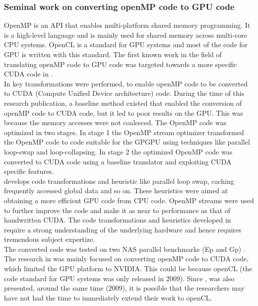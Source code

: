 \documentclass[a4paper,11pt]{article}
\begin{document}
\subsubsection{Seminal work on converting openMP code to GPU code}
\indent\indent OpenMP is an API that enables multi-platform shared memory programming. It is a high-level language and is mainly used for shared memory across multi-core CPU systems. OpenCL is a standard for GPU systems and most of the code for GPU is written with this standard. The first known work in the field of translating openMP code to GPU code was targeted towards a more specific CUDA code in \cite{firstwork}.\\
\indent In \cite{firstwork} key transformations were performed, to enable openMP code to be converted to CUDA (Compute Unified Device architecture) code. During the time of this research publication, a baseline method existed that enabled the conversion of openMP code to CUDA code, but it led to poor results on the GPU. This was because the memory accesses were not coalesced. The OpenMP code was optimized in two stages. In stage 1 the OpenMP stream optimizer transformed the OpenMP code to code suitable for the GPGPU using techniques like parallel loop-swap and loop-collapsing. In stage 2 the optimized OpenMP code was converted to CUDA code using a baseline translator and exploiting CUDA specific features.\\
\indent \cite{firstwork} develops code transformations and heuristic like parallel loop swap, caching frequently accessed global data and so on. These heuristics were aimed at obtaining a more efficient GPU code from CPU code. OpenMP streams  were used to further improve the code and make it as near to performance as that of handwritten CUDA. The code transformations and heuristics developed in \cite{firstwork} require a strong understanding of the underlying hardware and hence requires tremendous subject expertize.\\
\indent The converted code was tested on two NAS parallel benchmarks (Ep and Gp) \cite{nasbenchmark}. The research in \cite{firstwork} was mainly focused on converting openMP code to CUDA code, which limited the GPU platform to NVIDIA. This could be because openCL (the code standard for  GPU systems was only released in 2009). Since \cite{firstwork}, was also presented, around the same time  (2009), it is possible that the researchers may have not had the time to immediately extend their work to openCL.
\end{document}
